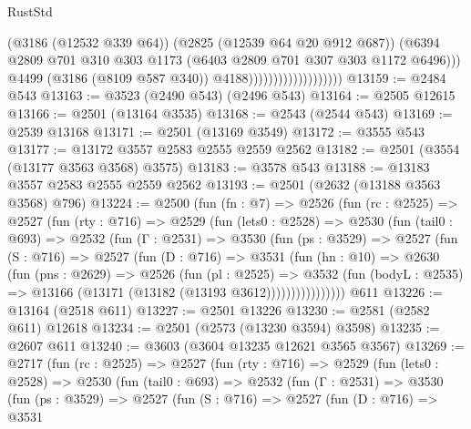 \begin{lexlean}{RustStd}
\begin{coremodule}
{\begin{coremodule}
{{{{{{{{{{{{{{{{{{{{                                            (@3186 (@12532 @339 @64))
                                            (@2825 (@12539 @64 @20 @912 @687))
                                            (@6394
                                              @2809
                                              @701
                                              @310
                                              @303
                                              @1173
                                              (@6403 @2809 @701 @307 @303 @1172 @6496)))
                                          @4499
                                          (@3186 (@8109 @587 @340))
                                          @4188)))))))))))))))))))
@13159 := @2484 @543
@13163 := @3523 (@2490 @543) (@2496 @543)
@13164 := @2505 @12615
@13166 := @2501 (@13164 @3535)
@13168 := @2543 (@2544 @543)
@13169 := @2539 @13168
@13171 := @2501 (@13169 @3549)
@13172 := @3555 @543
@13177 := @13172 @3557 @2583 @2555 @2559 @2562
@13182 := @2501 (@3554 (@13177 @3563 @3568) @3575)
@13183 := @3578 @543
@13188 := @13183 @3557 @2583 @2555 @2559 @2562
@13193 := @2501 (@2632 (@13188 @3563 @3568) @796)
@13224 := @2500
    (fun (fn : @7) =>
    @2526
      (fun (rc : @2525) =>
      @2527
        (fun (rty : @716) =>
        @2529
          (fun (lets0 : @2528) =>
          @2530
            (fun (tail0 : @693) =>
            @2532
              (fun (Γ : @2531) =>
              @3530
                (fun (ps : @3529) =>
                @2527
                  (fun (S : @716) =>
                  @2527
                    (fun (D : @716) =>
                    @3531
                      (fun (hn : @10) =>
                      @2630
                        (fun (pns : @2629) =>
                        @2526
                          (fun (pl : @2525) =>
                          @3532
                            (fun (bodyL : @2535) =>
                            @13166 (@13171 (@13182 (@13193 @3612))))))))))))))))
    @611
@13226 := @13164 (@2518 @611)
@13227 := @2501 @13226
@13230 := @2581 (@2582 @611) @12618
@13234 := @2501 (@2573 (@13230 @3594) @3598)
@13235 := @2607 @611
@13240 := @3603 (@3604 @13235 @12621 @3565 @3567)
@13269 := @2717
    (fun (rc : @2525) =>
    @2527
      (fun (rty : @716) =>
      @2529
        (fun (lets0 : @2528) =>
        @2530
          (fun (tail0 : @693) =>
          @2532
            (fun (Γ : @2531) =>
            @3530
              (fun (ps : @3529) =>
              @2527
                (fun (S : @716) =>
                @2527
                  (fun (D : @716) =>
                  @3531
}}}}}}}}}}}}}}}}}}}}
\end{coremodule}}
\end{coremodule}
\end{lexlean}
